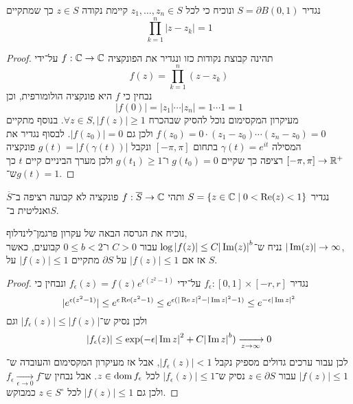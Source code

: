\question{}
נגדיר $S = \partial B(0, 1)$ ונוכיח כי לכל $z_1, \dots, z_n \in S$ קיימת נקודה $z \in S$ כך שמתקיים
\[
	\prod_{k = 1}^n |z - z_k| = 1
\]
\begin{proof}
	תהינה קבוצת נקודות כזו ונגדיר את הפונקציה $f : \mathbb{C} \to \mathbb{C}$ על־ידי
	\[
		f(z) = \prod_{k = 1}^n (z - z_k)
	\]
	נבחין כי $f$ היא פונקציה הולומורפית, וכן
	\[
		|f(0)| = |z_1| \cdots |z_n| = 1 \cdots 1 = 1
	\]
	מעיקרון המקסימום נוכל להסיק שבהכרח $\forall z \in S, |f(z)| \ge 1$.
	בנוסף מתקיים $f(z_0) = 0 \cdot (z_1 - z_0) \cdots (z_n - z_0) = 0$ ולכן גם $|f(z_0)| = 0$.
	לבסוף נגדיר את המסילה $\gamma(t) = e^{it}$ בתחום $[-\pi, \pi]$ ונקבל $g(t) = |f(\gamma(t))|$ פונקציה $[-\pi, \pi] \to \mathbb{R}^+$ רציפה כך שקיים $g(t_0) = 0$ ו־$g(t_1) \ge 1$ ולכן מערך הביניים קיים $t$ כך ש־$g(t) = 1$.
\end{proof}

\question{}
נגדיר $S = \{ z \in \mathbb{C} \mid 0 < \operatorname{Re}(z) < 1\}$ ותהי $f : \overline{S} \to \mathbb{C}$ פונקציה לא קבועה רציפה ב־$\overline{S}$ ואנליטית ב־$S$.

\subquestion{}
נוכיח את הגרסה הבאה של עקרון פרגמן־לינדלוף, \\
נניח ש־$\log |f(z)| \le C {|\operatorname{Im}(z)|}^b$ עבור $C > 0$ ו־$0 \le b < 2$ קבועים, כאשר $|\operatorname{Im}(z)| \to \infty$, \\
אז אם $|f(z)| \le 1$ על $\partial S$ מתקיים $|f(z)| \le 1$ על $S$.
\begin{proof}
	נגדיר $f_\epsilon : [0, 1] \times [-r, r]$ על־ידי $f_\epsilon(z) = f(z) e^{\epsilon (z^2 - 1)}$ ונבחין כי
	\[
		|e^{\epsilon (z^2 - 1)}|
		\le e^{\epsilon \operatorname{Re}(z^2 - 1)}
		\le e^{\epsilon({|\operatorname{Re} z|}^2 - {|\operatorname{Im} z|}^2 - 1)}
		\le e^{-\epsilon {|\operatorname{Im}z|}^2}
	\]
	ולכן נסיק ש־$|f_\epsilon(z)| \le |f(z)|$ וגם
	\[
		|f_\epsilon(z)|
		\le \exp(-\epsilon {|\operatorname{Im}z|}^2 + C {|\operatorname{Im} z|}^b)
		\xrightarrow[z \to \infty]{} 0
	\]
	לכן עבור ערכים גדולים מספיק נקבל $|f_\epsilon(z)| < 1$, אבל אז מעיקרון המקסימום והעובדה ש־$|f(z)| \le 1$ עבור $z \in \partial S$ נסיק ש־$|f_\epsilon(z)| \le 1$ לכל $z \in \operatorname{dom} f_\epsilon$.
	אבל נבחין ש־$f_\epsilon \xrightarrow[\epsilon \to 0]{} f$ ולכן גם $|f(z)| \le 1$ לכל $z \in S^\circ$ כמבוקש.
\end{proof}

